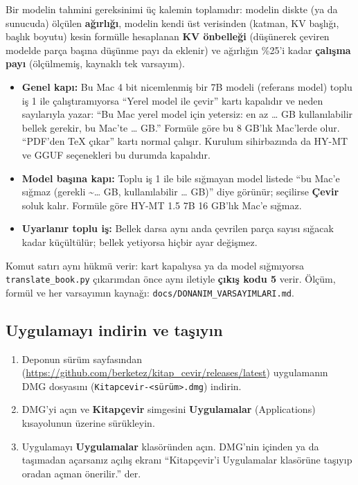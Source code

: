 \documentclass[11pt,a4paper]{article}
\newcommand{\dugme}[1]{\textsf{\bfseries #1}}
\newcommand{\dosya}[1]{\texttt{#1}}
\begin{document}
Bir modelin tahmini gereksinimi üç kalemin toplamıdır: modelin diskte (ya da
sunucuda) ölçülen \textbf{ağırlığı}, modelin kendi üst verisinden (katman,
KV başlığı, başlık boyutu) kesin formülle hesaplanan \textbf{KV önbelleği}
(düşünerek çeviren modelde parça başına düşünme payı da eklenir) ve ağırlığın
\%25'i kadar \textbf{çalışma payı} (ölçülmemiş, kaynaklı tek varsayım).

\begin{itemize}
  \item \textbf{Genel kapı:} Bu Mac 4 bit nicemlenmiş bir 7B modeli
        (referans model) toplu iş 1 ile çalıştıramıyorsa ``Yerel model ile
        çevir'' kartı kapalıdır ve neden sayılarıyla yazar: ``Bu Mac yerel
        model için yetersiz: en az \ldots{} GB kullanılabilir bellek gerekir,
        bu Mac'te \ldots{} GB.'' Formüle göre bu 8 GB'lık Mac'lerde olur.
        ``PDF'den TeX çıkar'' kartı normal çalışır. Kurulum sihirbazında da
        HY-MT ve GGUF seçenekleri bu durumda kapalıdır.
  \item \textbf{Model başına kapı:} Toplu iş 1 ile bile sığmayan model
        listede ``bu Mac'e sığmaz (gerekli \textasciitilde\ldots{} GB,
        kullanılabilir \ldots{} GB)'' diye görünür; seçilirse \dugme{Çevir}
        soluk kalır. Formüle göre HY-MT 1.5 7B 16 GB'lık Mac'e sığmaz.
  \item \textbf{Uyarlanır toplu iş:} Bellek darsa aynı anda çevrilen parça
        sayısı sığacak kadar küçültülür; bellek yetiyorsa hiçbir ayar
        değişmez.
\end{itemize}
Komut satırı aynı hükmü verir: kart kapalıysa ya da model sığmıyorsa
\dosya{translate\_book.py} çıkarımdan önce aynı iletiyle \textbf{çıkış kodu
5} verir. Ölçüm, formül ve her varsayımın kaynağı:
\dosya{docs/DONANIM\_VARSAYIMLARI.md}.

\subsection{Uygulamayı indirin ve taşıyın}\label{sec:dmg}
\begin{enumerate}
  \item Deponun sürüm sayfasından
        (\url{https://github.com/berketez/kitap_cevir/releases/latest})
        uygulamanın DMG dosyasını (\dosya{Kitapcevir-\allowbreak<sürüm>.dmg}) indirin.
  \item DMG'yi açın ve \textbf{Kitapçevir} simgesini \textbf{Uygulamalar}
        (Applications) kısayolunun üzerine sürükleyin.
  \item Uygulamayı \textbf{Uygulamalar} klasöründen açın. DMG'nin içinden ya
        da taşımadan açarsanız açılış ekranı ``Kitapçevir'i Uygulamalar
        klasörüne taşıyıp oradan açman önerilir.'' der.
\end{enumerate}
\end{document}
